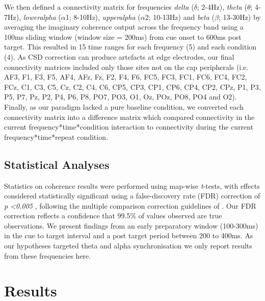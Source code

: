 \documentclass[preprint,authoryear,11pt,5p,times,twocolumns]{elsarticle}
\begin{document}
We then defined a connectivity matrix for frequencies \emph{delta} ($\delta$; 2-4Hz), \emph{theta} ($\theta$; 4-7Hz), \emph{loweralpha} ($\alpha$1; 8-10Hz), \emph{upperalpha} ($\alpha$2; 10-13Hz) and \emph{beta} ($\beta$; 13-30Hz) by averaging the imaginary coherence output across the frequency band using a 100ms sliding window (window size = 200ms) from cue onset to 600ms post target. This resulted in 15 time ranges for each frequency (5) and each condition (4). As CSD correction can produce artefacts at edge electrodes, our final connectivity matrices included only those sites not on the cap peripherals (i.e. AF3, F1, F3, F5, AF4, AFz, Fz, F2, F4, F6, FC5, FC3, FC1, FC6, FC4, FC2, FCz, C1, C3, C5, Cz, C2, C4, C6, CP5, CP3, CP1, CP6, CP4, CP2, CPz, P1, P3, P5, P7, Pz, P2, P4, P6, P8, PO7, PO3, O1, Oz, POz, PO8, PO4 and O2). Finally, as our paradigm lacked a pure baseline condition, we converted each connectivity matrix into a difference matrix which compared connectivity in the current frequency*time*condition interaction to connectivity during the current frequency*time*repeat condition. 
\subsection{Statistical Analyses}
Statistics on coherence results were performed using map-wise \emph{t}-tests, with effects considered statistically significant using a false-discovery rate (FDR) correction of \emph{p \textless 0.005} \citep{FDR2001}, following the multiple comparison correction guidelines of \citet{Nolte2004}. Our FDR correction reflects a confidence that 99.5\% of values observed are true observations. We present findings from an early preparatory window (100-300ms) in the cue to target interval and a post target period between 200 to 400ms. As our hypotheses targeted theta and alpha synchronisation we only report results from these frequencies here.

\section{Results}
\end{document}
